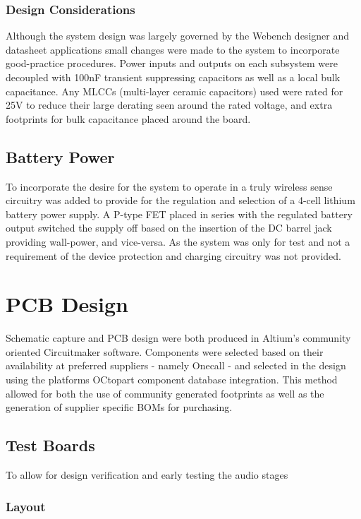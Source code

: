 \documentclass[main.tex]{subfiles}
\begin{document}
\subsubsection{Design Considerations}

Although the system design was largely governed by the Webench designer and datasheet applications small changes were made to the system to incorporate good-practice procedures. Power inputs and outputs on each subsystem were decoupled with 100nF transient suppressing capacitors as well as a local bulk capacitance. Any MLCCs (multi-layer ceramic capacitors) used were rated for 25V to reduce their large derating seen around the rated voltage, and extra footprints for bulk capacitance placed around the board. 

\subsection{Battery Power}

To incorporate the desire for the system to operate in a truly wireless sense circuitry was added to provide for the regulation and selection of a 4-cell lithium battery power supply. A P-type FET placed in series with the regulated battery output switched the supply off based on the insertion of the DC barrel jack providing wall-power, and vice-versa. As the system was only for test and not a requirement of the device protection and charging circuitry was not provided. 

\section{PCB Design}

Schematic capture and PCB design were both produced in Altium's community oriented Circuitmaker software. Components were selected based on their availability at preferred suppliers - namely Onecall - and selected in the design using the platforms OCtopart component database integration. This method allowed for both the use of community generated footprints as well as the generation of supplier specific BOMs for purchasing. 

\subsection{Test Boards}
To allow for design verification and early testing the audio stages 

\subsubsection{Layout}
\end{document}
